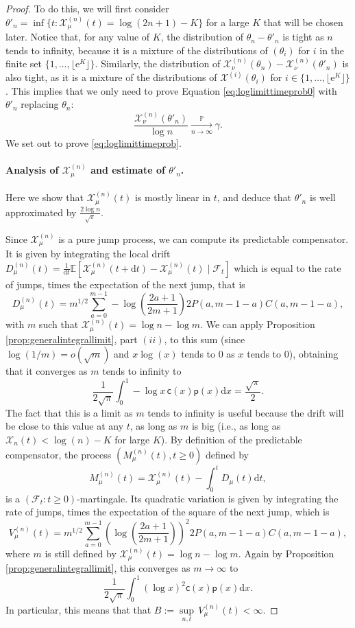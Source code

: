 \documentclass[11pt]{article}
\newcommand{\Xmun}{\mathcal{X}^{(n)}_{\mu}}
\newcommand{\Xnun}{\mathcal{X}^{(n)}_{\nu}}
\newcommand{\dH}{\gamma}
\newcommand{\pp}{\mathsf{p}}
\newcommand{\cc}{\mathsf{c}}
\newcommand{\ff}{\cc}
\newcommand{\pr}{\mathbb{P}}
\renewcommand{\geq}{\geqslant}
\newcommand{\dd}{\mathrm{d}}
\begin{document}
\begin{proof}
To do this, we will first consider $\theta'_n=\inf\{t: \Xmun(t) = \log (2n+1)-K\}$ for a large $K$ that will be chosen later. Notice that, for any value of $K$, the distribution of $\theta_n-\theta'_n$ is tight as $n$ tends to infinity, because it is a mixture of the distributions of $(\theta_i)$ for $i$ in the finite set $\{1,\ldots,\lfloor \mathrm{e}^{K}\rfloor\}.$ Similarly, the distribution of $\Xnun(\theta_n)-\Xnun(\theta'_n)$ is also tight, as it is a mixture of the distributions of $\mathcal{X}^{(i)}(\theta_i)$ for $i\in \{1,\ldots,\lfloor \mathrm{e}^{K}\rfloor\}$. This implies that we only need to prove Equation \eqref{eq:loglimittimeprob0} with $\theta'_n$ replacing $\theta_n$:
\begin{equation}\label{eq:loglimittimeprob}
\frac{ \Xnun(\theta'_n)}{\log n} \underset{n\to\infty}{\overset{\pr}\longrightarrow} \dH.  
\end{equation}
We set out to prove \eqref{eq:loglimittimeprob}.

\paragraph{Analysis of $\Xmun$ and estimate of $\theta'_n$.} Here we show that $\Xmun(t)$ is mostly linear in $t$, and deduce that $\theta'_n$ is well approximated by $\frac{2\log n}{\sqrt{\pi}}.
$

Since $\mathcal{X}^{(n)}_{\mu}$ is a pure jump process, we can compute its predictable compensator. It is given by integrating the local drift $D_\mu^{(n)}(t)=\frac{1}{ \mathrm{d}t} \mathbb{E}[\mathcal{X}^{(n)}_{\mu}(t+\dd t)-\mathcal{X}^{(n)}_{\mu}(t)\mid \mathcal{F}_t]$ which is  equal to the rate of jumps, times the expectation of the next jump, that is
\[ D_{\mu}^{(n)}(t)=m^{1/2}\sum_{a=0}^{m-1} -\log\left(\frac{2a+1}{2m+1}\right) 2P(a,m-1-a)C(a,m-1-a), \]
with $m$ such that $\mathcal{X}^{(n)}_{\mu}(t)=\log n - \log m.$
We can apply Proposition \ref{prop:generalintegrallimit}, part $(ii)$, to this sum (since $\log (1/m)=o(\sqrt{m})$ and $x\log(x)$ tends to $0$ as $x$ tends to $0$), obtaining that it converges as $m$ tends to infinity to
\[\frac1{2\sqrt{\pi}}\int_0^1 -\log x \, \ff(x) \pp(x)\dd x=\frac{\sqrt{\pi}}{2}.\]
The fact that this is a limit as $m$ tends to infinity is useful because the drift will be close to this value at any $t$, as long as $m$ is big (i.e., as long as $\mathcal{X}_n(t)< \log(n)-K$ for large $K$). By definition of the predictable compensator, the process $(M^{(n)}_{\mu}(t),t\geq 0)$ defined by 
\[M^{(n)}_{\mu}(t)=\Xmun(t)-\int_0^t D_{\mu}(t)\mathrm dt,\]
is a $(\mathcal{F}_t : t \geq 0)$-martingale. Its quadratic variation is given by integrating the rate of jumps, times the expectation of the square of the next jump, which is
\[V_{\mu}^{(n)}(t)=m^{1/2}\sum_{a=0}^{m-1} \left(\log\left(\frac{2a+1}{2m+1}\right)\right)^2 2P(a,m-1-a)C(a,m-1-a),\]
where $m$ is still defined by  $\mathcal{X}^{(n)}_{\mu}(t)=\log n - \log m.$ Again by Proposition \ref{prop:generalintegrallimit}, this converges as $m \to \infty$ to
\[\frac1{2\sqrt{\pi}}\int_0^1 (\log x)^2\ff(x)\pp(x)\dd x.\]
In particular, this means that that $B:=\underset{n,t}\sup \, V^{(n)}_{\mu}(t)<\infty.$ 



\end{proof}
\end{document}
